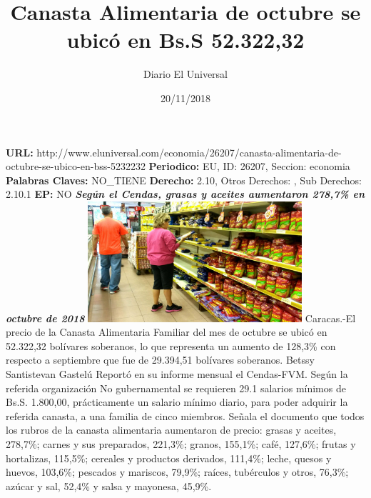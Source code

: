 \documentclass{article}%
\title{\textbf{Canasta Alimentaria de octubre se ubicó en Bs.S 52.322,32}}%
\author{Diario El Universal}%
\date{20/11/2018}%
\begin{document}
%
\normalsize%
\maketitle%
\textbf{URL: }%
http://www.eluniversal.com/economia/26207/canasta{-}alimentaria{-}de{-}octubre{-}se{-}ubico{-}en{-}bss{-}5232232\newline%
%
\textbf{Periodico: }%
EU, %
ID: %
26207, %
Seccion: %
economia\newline%
%
\textbf{Palabras Claves: }%
NO\_TIENE\newline%
%
\textbf{Derecho: }%
2.10, %
Otros Derechos: %
, %
Sub Derechos: %
2.10.1\newline%
%
\textbf{EP: }%
NO\newline%
\newline%
%
\textbf{\textit{Según el Cendas, grasas y aceites aumentaron 278,7\% en octubre de 2018}}%
\newline%
\newline%
%
\includegraphics[width=300px]{29.jpg}%
\newline%
%
Caracas.{-}El precio de la Canasta Alimentaria Familiar del mes de octubre se ubicó en 52.322,32 bolívares soberanos, lo que representa un aumento de 128,3\% con respecto a septiembre que fue de 29.394,51 bolívares soberanos.%
\newline%
%
Betssy Santistevan Gastelú%
\newline%
%
Reportó en su informe mensual el Cendas{-}FVM.%
\newline%
%
Según la referida organización No gubernamental se requieren 29.1 salarios mínimos de Bs.S. 1.800,00, prácticamente un salario mínimo diario, para poder adquirir la referida canasta, a una familia de cinco miembros.%
\newline%
%
Señala el documento que todos los rubros de la canasta alimentaria aumentaron de precio: grasas y aceites, 278,7\%; carnes y sus preparados, 221,3\%; granos, 155,1\%; café, 127,6\%; frutas y hortalizas, 115,5\%; cereales y productos derivados, 111,4\%; leche, quesos y huevos, 103,6\%; pescados y mariscos, 79,9\%; raíces, tubérculos y otros, 76,3\%; azúcar y sal, 52,4\% y salsa y mayonesa, 45,9\%.%
\end{document}
